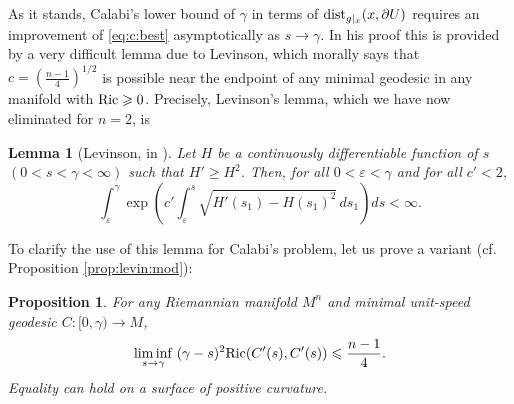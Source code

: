 \documentclass[11pt,reqno]{amsart}
\renewcommand{\leq}{\leqslant}
\renewcommand{\geq}{\geqslant}
\theoremstyle{plain}
\newtheorem{lemma}[theorem]{Lemma}
\newtheorem{proposition}[theorem]{Proposition}
\theoremstyle{definition}
\numberwithin{equation}{section}
\begin{document}
As it stands, Calabi's lower bound of $\gamma$ in terms of ${\rm dist}_{g|_x}(x,\partial U)$ requires an improvement of \eqref{eq:c:best} asymptotically as $s \to \gamma$. In his proof this is provided by a very difficult lemma due to Levinson, which morally says that $c = (\frac{n-1}{4})^{1/2}$ is possible near the endpoint of any minimal geodesic in any manifold with ${\rm Ric}\geq 0$. Precisely, Levinson's lemma, which we have now eliminated for $n = 2$, is

\begin{lemma}[Levinson, in {\cite[p. 123]{EC}}] \label{LL}
Let $H$ be a continuously differentiable function of $s$ $(0<s<\gamma<\infty)$ such that $H'\geq H^2$. Then, for all $0 < \varepsilon < \gamma$ and for all $c'<2$,
$$\int_{\varepsilon}^{\gamma}\exp\left(c'\int_{\varepsilon}^{s}\sqrt{H'(s_{1})-H(s_{1})^{2}}\,ds_{1}\right)ds<\infty.$$
\end{lemma}

To clarify the use of this lemma for Calabi's problem, let us prove a variant (cf. Proposition \ref{prop:levin:mod}):

\begin{proposition}\label{2.3.10}
For any Riemannian manifold $M^n$ and minimal unit-speed geodesic $C: [0,\gamma) \to M$,
$$\liminf_{s \to \gamma} \;(\gamma-s)^2{\rm Ric}(C'(s),C'(s)) \leq \frac{n-1}{4}.$$
Equality can hold on a surface of positive curvature.
\end{proposition}
\end{document}
